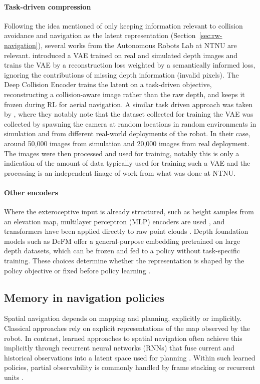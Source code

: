 \paragraph{Task-driven compression}
Following the idea mentioned of only keeping information relevant to collision avoidance and navigation as the latent representation (Section~\ref{sec:rw-navigation}), several works from the Autonomous Robots Lab at NTNU are relevant. \textcite{kulkarni2023semantically} introduced a VAE trained on real and simulated depth images and trains the VAE by a reconstruction loss weighted by a semantically informed loss, ignoring the contributions of missing depth information (invalid pixels). The Deep Collision Encoder \parencite{kulkarni2023task, kulkarni2024dce} trains the latent on a task-driven objective, reconstructing a collision-aware image rather than the raw depth, and keeps it frozen during RL for aerial navigation. A similar task driven approach was taken by \textcite{hoeller2021learning}, where they notably note that the dataset collected for training the VAE was collected by spawning the camera at random locations in random environments in simulation and from different real-world deployments of the robot. In their case, around 50,000 images from simulation and 20,000 images from real deployment. The images were then processed and used for training, notably this is only a indication of the amount of data typically used for training such a VAE and the processing is an independent linage of work from what was done at NTNU. 

\paragraph{Other encoders}
Where the exteroceptive input is already structured, such as height samples from an elevation map, multilayer perceptron (MLP) encoders are used \parencite{miki2022learning}, and transformers have been applied directly to raw point clouds \parencite{yuan2025reasan}. Depth foundation models such as DeFM \parencite{patel2026defm} offer a general-purpose embedding pretrained on large depth datasets, which can be frozen and fed to a policy without task-specific training. These choices determine whether the representation is shaped by the policy objective or fixed before policy learning \parencite{lesort2018state}.

\subsection{Memory in navigation policies}
\label{sec:rw-memory}
Spatial navigation depends on mapping and planning, explicitly or implicitly. Classical approaches rely on explicit representations of the map observed by the robot. In contrast, learned approaches to spatial navigation often achieve this implicitly through recurrent neural networks (RNNs) that fuse current and historical observations into a latent space used for planning \parencite{yang2026spatially}. Within such learned policies, partial observability is commonly handled by frame stacking or recurrent units \parencite{ha2025learning, morad2023popgym}.

